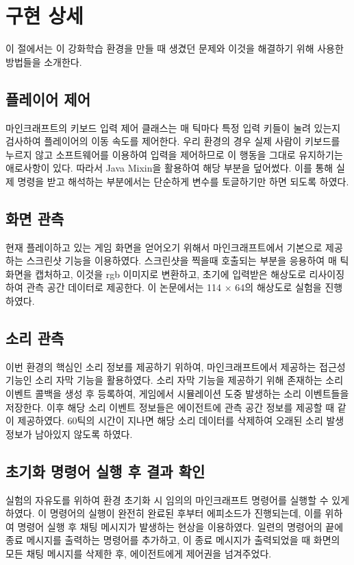 \documentclass[oneside, under, ko]{snuthesis}
\begin{document}
\section{구현 상세}
이 절에서는 이 강화학습 환경을 만들 때 생겼던 문제와 이것을 해결하기 위해 사용한 방법들을 소개한다.
\subsection{플레이어 제어}
마인크래프트의 키보드 입력 제어 클래스는 매 틱마다 특정 입력 키들이 눌려 있는지 검사하여 플레이어의 이동 속도를 제어한다. 우리 환경의 경우 실제 사람이 키보드를 누르지 않고 소프트웨어를 이용하여 입력을 제어하므로 이 행동을 그대로 유지하기는 애로사항이 있다. 따라서 Java Mixin을 활용하여 해당 부분을 덮어썼다. 이를 통해 실제 명령을 받고 해석하는 부분에서는 단순하게 변수를 토글하기만 하면 되도록 하였다.

\subsection{화면 관측}
현재 플레이하고 있는 게임 화면을 얻어오기 위해서 마인크래프트에서 기본으로 제공하는 스크린샷 기능을 이용하였다. 스크린샷을 찍을때 호출되는 부분을 응용하여 매 틱 화면을 캡처하고, 이것을 rgb 이미지로 변환하고, 초기에 입력받은 해상도로 리사이징하여 관측 공간 데이터로 제공한다. 이 논문에서는 114 $\times$ 64의 해상도로 실험을 진행하였다.

\subsection{소리 관측}
이번 환경의 핵심인 소리 정보를 제공하기 위하여, 마인크래프트에서 제공하는 접근성 기능인 소리 자막 기능을 활용하였다. 소리 자막 기능을 제공하기 위해 존재하는 소리 이벤트 콜백을 생성 후 등록하여, 게임에서 시뮬레이션 도중 발생하는 소리 이벤트들을 저장한다. 이후 해당 소리 이벤트 정보들은 에이전트에 관측 공간 정보를 제공할 때 같이 제공하였다. 60틱의 시간이 지나면 해당 소리 데이터를 삭제하여 오래된 소리 발생 정보가 남아있지 않도록 하였다.

\subsection{초기화 명령어 실행 후 결과 확인}
실험의 자유도를 위하여 환경 초기화 시 임의의 마인크래프트 명령어를 실행할 수 있게 하였다. 이 명령어의 실행이 완전히 완료된 후부터 에피소드가 진행되는데, 이를 위하여 명령어 실행 후 채팅 메시지가 발생하는 현상을 이용하였다. 일련의 명령어의 끝에 종료 메시지를 출력하는 명령어를 추가하고, 이 종료 메시지가 출력되었을 때 화면의 모든 채팅 메시지를 삭제한 후, 에이전트에게 제어권을 넘겨주었다.
\end{document}
